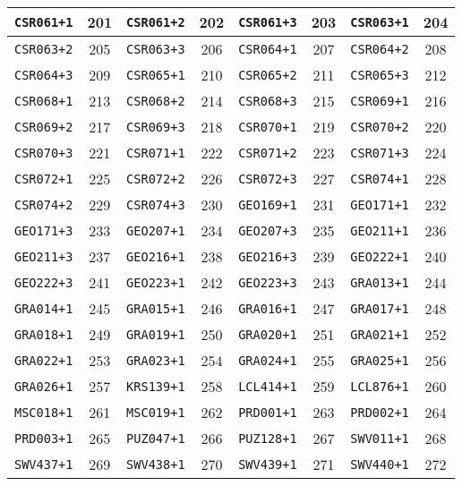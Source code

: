 \documentclass[./main.tex]{subfiles}
\begin{document}
\begin{table}[H]
\begin{tabular}{|c|c|c|c|c|c|c|c|}
\hline
\texttt{CSR061+1} & 201 & \texttt{CSR061+2} & 202 & \texttt{CSR061+3} & 203 & \texttt{CSR063+1} & 204\\
\hline
\texttt{CSR063+2} & 205 & \texttt{CSR063+3} & 206 & \texttt{CSR064+1} & 207 & \texttt{CSR064+2} & 208\\
\hline
\texttt{CSR064+3} & 209 & \texttt{CSR065+1} & 210 & \texttt{CSR065+2} & 211 & \texttt{CSR065+3} & 212\\
\hline
\texttt{CSR068+1} & 213 & \texttt{CSR068+2} & 214 & \texttt{CSR068+3} & 215 & \texttt{CSR069+1} & 216\\
\hline
\texttt{CSR069+2} & 217 & \texttt{CSR069+3} & 218 & \texttt{CSR070+1} & 219 & \texttt{CSR070+2} & 220\\
\hline
\texttt{CSR070+3} & 221 & \texttt{CSR071+1} & 222 & \texttt{CSR071+2} & 223 & \texttt{CSR071+3} & 224\\
\hline
\texttt{CSR072+1} & 225 & \texttt{CSR072+2} & 226 & \texttt{CSR072+3} & 227 & \texttt{CSR074+1} & 228\\
\hline
\texttt{CSR074+2} & 229 & \texttt{CSR074+3} & 230 & \texttt{GEO169+1} & 231 & \texttt{GEO171+1} & 232\\
\hline
\texttt{GEO171+3} & 233 & \texttt{GEO207+1} & 234 & \texttt{GEO207+3} & 235 & \texttt{GEO211+1} & 236\\
\hline
\texttt{GEO211+3} & 237 & \texttt{GEO216+1} & 238 & \texttt{GEO216+3} & 239 & \texttt{GEO222+1} & 240\\
\hline
\texttt{GEO222+3} & 241 & \texttt{GEO223+1} & 242 & \texttt{GEO223+3} & 243 & \texttt{GRA013+1} & 244\\
\hline
\texttt{GRA014+1} & 245 & \texttt{GRA015+1} & 246 & \texttt{GRA016+1} & 247 & \texttt{GRA017+1} & 248\\
\hline
\texttt{GRA018+1} & 249 & \texttt{GRA019+1} & 250 & \texttt{GRA020+1} & 251 & \texttt{GRA021+1} & 252\\
\hline
\texttt{GRA022+1} & 253 & \texttt{GRA023+1} & 254 & \texttt{GRA024+1} & 255 & \texttt{GRA025+1} & 256\\
\hline
\texttt{GRA026+1} & 257 & \texttt{KRS139+1} & 258 & \texttt{LCL414+1} & 259 & \texttt{LCL876+1} & 260\\
\hline
\texttt{MSC018+1} & 261 & \texttt{MSC019+1} & 262 & \texttt{PRD001+1} & 263 & \texttt{PRD002+1} & 264\\
\hline
\texttt{PRD003+1} & 265 & \texttt{PUZ047+1} & 266 & \texttt{PUZ128+1} & 267 & \texttt{SWV011+1} & 268\\
\hline
\texttt{SWV437+1} & 269 & \texttt{SWV438+1} & 270 & \texttt{SWV439+1} & 271 & \texttt{SWV440+1} & 272\\

\end{tabular}
\end{table}
\end{document}
